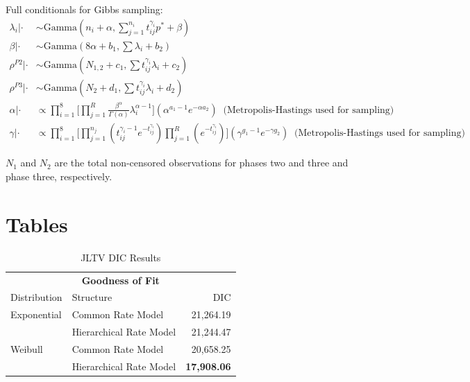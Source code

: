 \documentclass[12pt]{article}
\begin{document}
Full conditionals for Gibbs sampling:
\begin{align*}
\lambda_i|\cdot &\sim \text{Gamma}(n_i + \alpha, \sum_{j=1}^{n_i}t_{ij}^{\gamma_i} p^* + \beta) \\
\beta|\cdot &\sim \text{Gamma}(8\alpha + b_1, \sum{\lambda_i} + b_2) \\
\rho^{P2}|\cdot &\sim \text{Gamma}(N_{1,2} + c_1, \sum{t_{ij}^{\gamma_i} \lambda_i} + c_2) \\
\rho^{P3}|\cdot &\sim \text{Gamma}(N_{2} + d_1, \sum{t_{ij}^{\gamma_i} \lambda_i} + d_2) \\
\alpha|\cdot &\propto \prod_{i = 1}^8 \Bigg[\prod_{j =1}^R \frac{\beta^\alpha}{\Gamma(\alpha)}\lambda_i^{\alpha -
  1}\Bigg] (\alpha^{a_1-1}e^{-\alpha a_2}) \;\; \text{(Metropolis-Hastings used for sampling)}\\
\gamma|\cdot &\propto \prod_{i = 1}^8 \Bigg[ \prod_{j = 1}^{n_j}(t_{ij}^{\gamma_i-1} e^{-t_{ij}^{\gamma_i}})\prod_{j = 1}^R(e^{-t_{ij}^{\gamma_i}}) \Bigg] (\gamma^{g_1 - 1}e^{-\gamma g_2}) \;\;\text{(Metropolis-Hastings used for sampling)}
\end{align*}

$N_1$ and $N_2$ are the total non-censored observations for phases two and three
and phase three, respectively.

\section{Tables}

\begin{table}[H]
\centering
\begin{tabular}{|l|l|r|}
\multicolumn{3}{c}{\textbf{Goodness of Fit}} \\
\cline{1-3}
Distribution    & Structure & DIC \\
\hline
Exponential   & Common Rate Model                     & 21,264.19             \\
              & Hierarchical Rate Model               & 21,244.47             \\
Weibull       & Common Rate Model                     & 20,658.25             \\
              & Hierarchical Rate Model               & \textbf{17,908.06}    \\
\hline
\end{tabular}
\caption{JLTV DIC Results}
\label{table:ta1}
\end{table}
\end{document}
